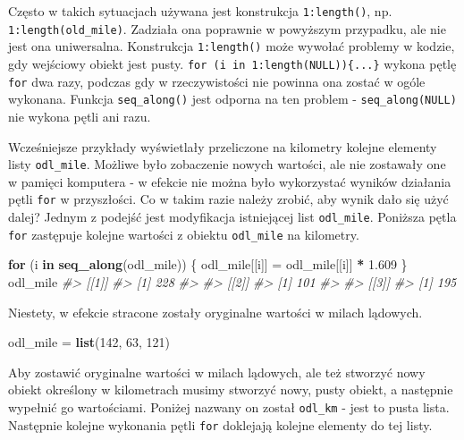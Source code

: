 \documentclass[paper=6in:9in,pagesize=pdftex,headinclude=on,footinclude=on,10pt]{scrbook}
\newenvironment{Shaded}{\begin{snugshade}}{\end{snugshade}}
\newcommand{\CommentTok}[1]{\textcolor[rgb]{0.56,0.35,0.01}{\textit{#1}}}
\newcommand{\ControlFlowTok}[1]{\textcolor[rgb]{0.13,0.29,0.53}{\textbf{#1}}}
\newcommand{\DecValTok}[1]{\textcolor[rgb]{0.00,0.00,0.81}{#1}}
\newcommand{\FloatTok}[1]{\textcolor[rgb]{0.00,0.00,0.81}{#1}}
\newcommand{\KeywordTok}[1]{\textcolor[rgb]{0.13,0.29,0.53}{\textbf{#1}}}
\newcommand{\NormalTok}[1]{#1}
\newcommand{\OperatorTok}[1]{\textcolor[rgb]{0.81,0.36,0.00}{\textbf{#1}}}
\newcommand{\StringTok}[1]{\textcolor[rgb]{0.31,0.60,0.02}{#1}}
\let\BeginKnitrBlock\begin \let\EndKnitrBlock\end
\begin{document}
\BeginKnitrBlock{rmdinfo}
Często w takich sytuacjach używana jest konstrukcja \texttt{1:length()}, np. \texttt{1:length(old\_mile)}.
Zadziała ona poprawnie w powyższym przypadku, ale nie jest ona uniwersalna.
Konstrukcja \texttt{1:length()} może wywołać problemy w kodzie, gdy wejściowy obiekt jest pusty.
\texttt{for\ (i\ in\ 1:length(NULL))\{...\}} wykona pętlę \texttt{for} dwa razy, podczas gdy w rzeczywistości nie powinna ona zostać w ogóle wykonana.
Funkcja \texttt{seq\_along()} jest odporna na ten problem - \texttt{seq\_along(NULL)} nie wykona pętli ani razu.
\EndKnitrBlock{rmdinfo}

Wcześniejsze przykłady wyświetlały przeliczone na kilometry kolejne elementy listy \texttt{odl\_mile}.
Możliwe było zobaczenie nowych wartości, ale nie zostawały one w pamięci komputera - w efekcie nie można było wykorzystać wyników działania pętli \texttt{for} w przyszłości.
Co w takim razie należy zrobić, aby wynik dało się użyć dalej?
Jednym z podejść jest modyfikacja istniejącej list \texttt{odl\_mile}.
Poniższa pętla \texttt{for} zastępuje kolejne wartości z obiektu \texttt{odl\_mile} na kilometry.

\begin{Shaded}
\begin{Highlighting}[]
\ControlFlowTok{for}\NormalTok{ (i }\ControlFlowTok{in} \KeywordTok{seq_along}\NormalTok{(odl_mile)) \{}
\NormalTok{  odl_mile[[i]] =}\StringTok{ }\NormalTok{odl_mile[[i]] }\OperatorTok{*}\StringTok{ }\FloatTok{1.609}
\NormalTok{\}}
\NormalTok{odl_mile}
\CommentTok{#> [[1]]}
\CommentTok{#> [1] 228}
\CommentTok{#> }
\CommentTok{#> [[2]]}
\CommentTok{#> [1] 101}
\CommentTok{#> }
\CommentTok{#> [[3]]}
\CommentTok{#> [1] 195}
\end{Highlighting}
\end{Shaded}

Niestety, w efekcie stracone zostały oryginalne wartości w milach lądowych.

\begin{Shaded}
\begin{Highlighting}[]
\NormalTok{odl_mile =}\StringTok{ }\KeywordTok{list}\NormalTok{(}\DecValTok{142}\NormalTok{, }\DecValTok{63}\NormalTok{, }\DecValTok{121}\NormalTok{)}
\end{Highlighting}
\end{Shaded}

Aby zostawić oryginalne wartości w milach lądowych, ale też stworzyć nowy obiekt określony w kilometrach musimy stworzyć nowy, pusty obiekt, a następnie wypełnić go wartościami.
Poniżej nazwany on został \texttt{odl\_km} - jest to pusta lista.
Następnie kolejne wykonania pętli \texttt{for} doklejają kolejne elementy do tej listy.
\end{document}
